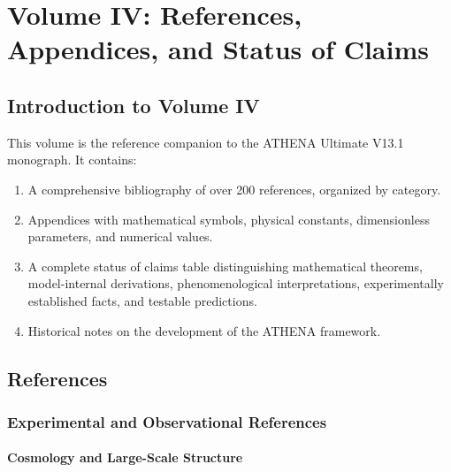 \documentclass[12pt,oneside]{book}
\begin{document}
\part{Volume IV: References, Appendices, and Status of Claims}

\chapter*{Introduction to Volume IV}

This volume is the reference companion to the ATHENA Ultimate V13.1 monograph. It contains:

\begin{enumerate}
    \item A comprehensive bibliography of over 200 references, organized by category.
    \item Appendices with mathematical symbols, physical constants, dimensionless parameters, and numerical values.
    \item A complete status of claims table distinguishing mathematical theorems, model-internal derivations, phenomenological interpretations, experimentally established facts, and testable predictions.
    \item Historical notes on the development of the ATHENA framework.
\end{enumerate}

\chapter{References}

\section{Experimental and Observational References}

\subsection{Cosmology and Large-Scale Structure}
\end{document}
